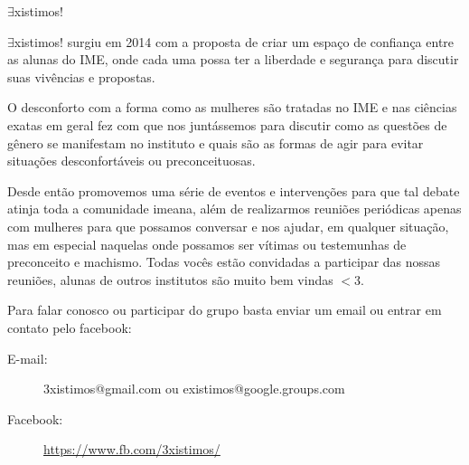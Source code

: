 \begin{subsecao}{$\exists$xistimos!}



$\exists$xistimos! surgiu em 2014 com a proposta de criar um espaço de
confiança entre as alunas do IME, onde cada uma possa ter a liberdade e
segurança para discutir suas vivências e propostas.

O desconforto com a forma como as mulheres são tratadas no IME e nas ciências
exatas em geral fez com que nos juntássemos para discutir como as questões de
gênero se manifestam no instituto e quais são as formas de agir para evitar
situações desconfortáveis ou preconceituosas.

Desde então promovemos uma série de eventos e intervenções para que tal debate
atinja toda a comunidade imeana, além de realizarmos reuniões periódicas apenas
com mulheres para que possamos conversar e nos ajudar, em qualquer situação,
mas em especial naquelas onde possamos ser vítimas ou testemunhas de  
preconceito e machismo. Todas vocês estão convidadas a participar das nossas  
reuniões, alunas de outros institutos são muito bem vindas $<$3.

Para falar conosco ou participar do grupo basta enviar um email ou entrar em
contato pelo facebook:


\begin{description}

\item[E-mail:] 3xistimos@gmail.com ou existimos@google.groups.com
\item[Facebook:] \url{https://www.fb.com/3xistimos/}

\end{description}


\end{subsecao}

